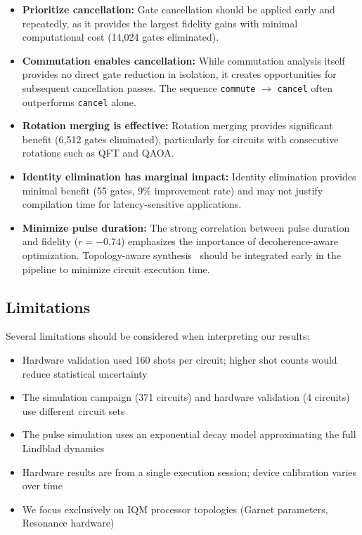 \documentclass[twocolumn,showpacs,preprintnumbers,amsmath,amssymb,prb]{revtex4-2}
\begin{document}
\begin{itemize}
    \item \textbf{Prioritize cancellation:} Gate cancellation should be applied early and repeatedly, as it provides the largest fidelity gains with minimal computational cost (14,024 gates eliminated).
    
    \item \textbf{Commutation enables cancellation:} While commutation analysis itself provides no direct gate reduction in isolation, it creates opportunities for subsequent cancellation passes. The sequence \texttt{commute} $\rightarrow$ \texttt{cancel} often outperforms \texttt{cancel} alone.
    
    \item \textbf{Rotation merging is effective:} Rotation merging provides significant benefit (6,512 gates eliminated), particularly for circuits with consecutive rotations such as QFT and QAOA.
    
    \item \textbf{Identity elimination has marginal impact:} Identity elimination provides minimal benefit (55 gates, 9\% improvement rate) and may not justify compilation time for latency-sensitive applications.
    
    \item \textbf{Minimize pulse duration:} The strong correlation between pulse duration and fidelity ($r = -0.74$) emphasizes the importance of decoherence-aware optimization. Topology-aware synthesis~\cite{cowtan2019qubit} should be integrated early in the pipeline to minimize circuit execution time.
\end{itemize}

\subsection{Limitations}

Several limitations should be considered when interpreting our results:

\begin{itemize}
    \item Hardware validation used 160 shots per circuit; higher shot counts would reduce statistical uncertainty
    \item The simulation campaign (371 circuits) and hardware validation (4 circuits) use different circuit sets
    \item The pulse simulation uses an exponential decay model approximating the full Lindblad dynamics
    \item Hardware results are from a single execution session; device calibration varies over time
    \item We focus exclusively on IQM processor topologies (Garnet parameters, Resonance hardware)
\end{itemize}
\end{document}
